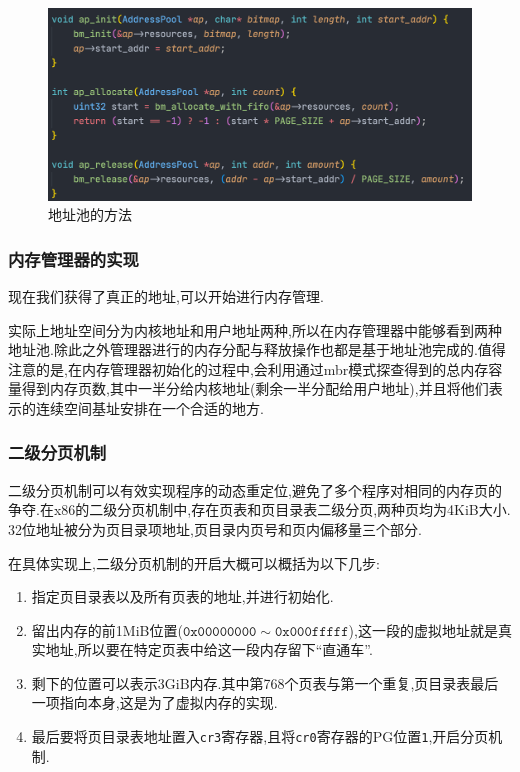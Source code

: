 \begin{figure}[H]
    \centering
    \includegraphics[width=\textwidth]{figures/ap1.png}
    \caption{地址池的方法}
    \label{fig:my_label}
\end{figure}

\subsubsection{内存管理器的实现}
现在我们获得了真正的地址,可以开始进行内存管理.

实际上地址空间分为内核地址和用户地址两种,所以在内存管理器中能够看到两种地址池.除此之外管理器进行的内存分配与释放操作也都是基于地址池完成的.值得注意的是,在内存管理器初始化的过程中,会利用通过mbr模式探查得到的总内存容量得到内存页数,其中一半分给内核地址(剩余一半分配给用户地址),并且将他们表示的连续空间基址安排在一个合适的地方.

\subsubsection{二级分页机制}
二级分页机制可以有效实现程序的动态重定位,避免了多个程序对相同的内存页的争夺.在x86的二级分页机制中,存在页表和页目录表二级分页,两种页均为4KiB大小. 32位地址被分为页目录项地址,页目录内页号和页内偏移量三个部分.

在具体实现上,二级分页机制的开启大概可以概括为以下几步:

\begin{enumerate}[itemindent=1em]
    \item 指定页目录表以及所有页表的地址,并进行初始化.
    \item 留出内存的前1MiB位置($\mathtt{0x00000000} \sim \mathtt{0x000fffff}$),这一段的虚拟地址就是真实地址,所以要在特定页表中给这一段内存留下``直通车''.
    \item 剩下的位置可以表示3GiB内存.其中第768个页表与第一个重复,页目录表最后一项指向本身,这是为了虚拟内存的实现.
    \item 最后要将页目录表地址置入\texttt{cr3}寄存器,且将\texttt{cr0}寄存器的PG位置\texttt{1},开启分页机制.
\end{enumerate}


